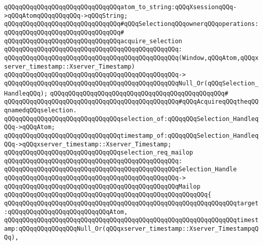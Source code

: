 \verb|qQQqqQQqqQQqqQQqqQQqqQQqqQQqqQQqatom_to_string:qQQqXsessionqQQq->qQQqAtomqQQqqQQqqQQq->qQQqString;|\newline
\newline
\verb|qQQqqQQqqQQqqQQqqQQqqQQqqQQqqQQq#qQQqSelectionqQQqownerqQQqoperations:|\newline
\verb|qQQqqQQqqQQqqQQqqQQqqQQqqQQqqQQq#|\newline
\verb|qQQqqQQqqQQqqQQqqQQqqQQqqQQqqQQqacquire_selection|\newline
\verb|qQQqqQQqqQQqqQQqqQQqqQQqqQQqqQQqqQQqqQQqqQQqqQQq:|\newline
\verb|qQQqqQQqqQQqqQQqqQQqqQQqqQQqqQQqqQQqqQQqqQQqqQQq(Window,qQQqAtom,qQQqxserver_timestamp::Xserver_Timestamp)|\newline
\verb|qQQqqQQqqQQqqQQqqQQqqQQqqQQqqQQqqQQqqQQqqQQqqQQq->|\newline
\verb|qQQqqQQqqQQqqQQqqQQqqQQqqQQqqQQqqQQqqQQqqQQqqQQqNull_Or(qQQqSelection_HandleqQQq);|\newline
\verb|qQQqqQQqqQQqqQQqqQQqqQQqqQQqqQQqqQQqqQQqqQQqqQQq#|\newline
\verb|qQQqqQQqqQQqqQQqqQQqqQQqqQQqqQQqqQQqqQQqqQQqqQQq#qQQqAcquireqQQqtheqQQqnamedqQQqselection.|\newline
\newline
\verb|qQQqqQQqqQQqqQQqqQQqqQQqqQQqqQQqselection_of:qQQqqQQqSelection_HandleqQQq->qQQqAtom;|\newline
\verb|qQQqqQQqqQQqqQQqqQQqqQQqqQQqqQQqtimestamp_of:qQQqqQQqSelection_HandleqQQq->qQQqxserver_timestamp::Xserver_Timestamp;|\newline
\newline
\verb|qQQqqQQqqQQqqQQqqQQqqQQqqQQqqQQqselection_req_mailop|\newline
\verb|qQQqqQQqqQQqqQQqqQQqqQQqqQQqqQQqqQQqqQQqqQQqqQQq:|\newline
\verb|qQQqqQQqqQQqqQQqqQQqqQQqqQQqqQQqqQQqqQQqqQQqqQQqSelection_Handle|\newline
\verb|qQQqqQQqqQQqqQQqqQQqqQQqqQQqqQQqqQQqqQQqqQQqqQQq->|\newline
\verb|qQQqqQQqqQQqqQQqqQQqqQQqqQQqqQQqqQQqqQQqqQQqqQQqMailop|\newline
\verb|qQQqqQQqqQQqqQQqqQQqqQQqqQQqqQQqqQQqqQQqqQQqqQQqqQQqqQQq{|\newline
\verb|qQQqqQQqqQQqqQQqqQQqqQQqqQQqqQQqqQQqqQQqqQQqqQQqqQQqqQQqqQQqqQQqtarget:qQQqqQQqqQQqqQQqqQQqqQQqqQQqAtom,|\newline
\verb|qQQqqQQqqQQqqQQqqQQqqQQqqQQqqQQqqQQqqQQqqQQqqQQqqQQqqQQqqQQqqQQqtimestamp:qQQqqQQqqQQqqQQqNull_Or(qQQqxserver_timestamp::Xserver_TimestampqQQq),|\newline
